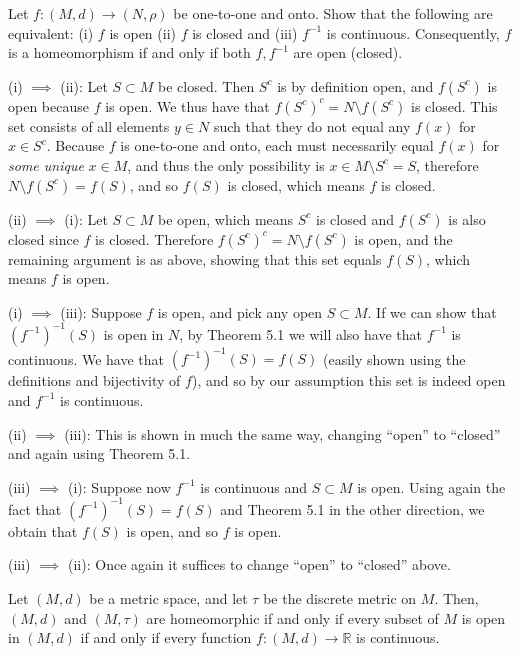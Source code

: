 \begin{exercise}{57}
    Let $f: (M, d) \rightarrow (N, \rho)$ be one-to-one and onto.
    Show that the following are equivalent: (i) $f$ is open (ii) $f$ is closed and (iii) $f^{-1}$ is continuous.
    Consequently, $f$ is a homeomorphism if and only if both $f, f^{-1}$ are open (closed).
\end{exercise}

\begin{solution}
    
    (i) $\implies$ (ii): Let $S \subset M$ be closed.
    Then $S^{c}$ is by definition open, and $f(S^{c})$ is open because $f$ is open.
    We thus have that $f(S^c)^c = N \setminus f(S^c)$ is closed.
    This set consists of all elements $y \in N$ such that they do not equal any $f(x)$ for $x \in S^c$.
    Because $f$ is one-to-one and onto, each must necessarily equal $f(x)$ for \textit{some unique} $x \in M$, and thus the only possibility is $x \in M \setminus S^{c} = S$, therefore $N \setminus f(S^c) = f(S)$, and so $f(S)$ is closed, which means $f$ is closed.

    (ii) $\implies$ (i): Let $S \subset M$ be open, which means $S^{c}$ is closed and $f(S^c)$ is also closed since $f$ is closed.
    Therefore $f(S^c)^c = N \setminus f(S^c)$ is open, and the remaining argument is as above, showing that this set equals $f(S)$, which means $f$ is open.

    (i) $\implies$ (iii): Suppose $f$ is open, and pick any open $S \subset M$.
    If we can show that $(f^{-1})^{-1}(S)$ is open in $N$, by Theorem 5.1 we will also have that $f^{-1}$ is continuous.
    We have that $(f^{-1})^{-1}(S) = f(S)$ (easily shown using the definitions and bijectivity of $f$), and so by our assumption this set is indeed open and $f^{-1}$ is continuous.
    
    (ii) $\implies$ (iii): This is shown in much the same way, changing ``open'' to ``closed'' and again using Theorem 5.1.

    (iii) $\implies$ (i): Suppose now $f^{-1}$ is continuous and $S \subset M$ is open.
    Using again the fact that $(f^{-1})^{-1}(S) = f(S)$ and Theorem 5.1 in the other direction, we obtain that $f(S)$ is open, and so $f$ is open.

    (iii) $\implies$ (ii): Once again it suffices to change ``open'' to ``closed'' above.
    
\end{solution}

\begin{exercise}{60}
    Let $(M, d)$ be a metric space, and let $\tau$ be the discrete metric on $M$.
    Then, $(M, d)$ and $(M, \tau)$ are homeomorphic if and only if every subset of $M$ is open in $(M, d)$ if and only if every function $f: (M, d) \rightarrow \mathbb{R}$ is continuous.
\end{exercise}

